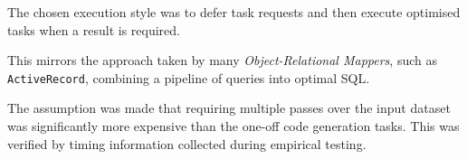 The chosen execution style was to defer task requests and then execute optimised tasks when a result is required.

This mirrors the approach taken by many \emph{Object-Relational Mappers}, such as \verb|ActiveRecord|, combining a pipeline of queries into optimal SQL.

The assumption was made that requiring multiple passes over the input dataset was significantly more expensive than the one-off code generation tasks. This was verified by timing information collected during empirical testing.
